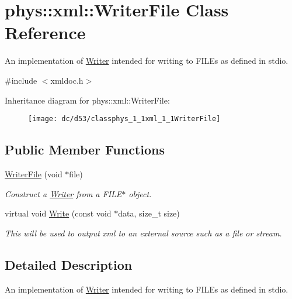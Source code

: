 \hypertarget{classphys_1_1xml_1_1WriterFile}{
\section{phys::xml::WriterFile Class Reference}
\label{dc/d53/classphys_1_1xml_1_1WriterFile}
}


An implementation of \hyperlink{classphys_1_1xml_1_1Writer}{Writer} intended for writing to FILEs as defined in stdio.  




{\ttfamily \#include $<$xmldoc.h$>$}

Inheritance diagram for phys::xml::WriterFile:\begin{figure}[H]
\begin{center}
\leavevmode
\texttt{[image: dc/d53/classphys\_1\_1xml\_1\_1WriterFile]}
\end{center}
\end{figure}
\subsection*{Public Member Functions}
\begin{DoxyCompactItemize}
\item 
\hyperlink{classphys_1_1xml_1_1WriterFile_aba665d4dc17c956798a80cb4e8c2774d}{WriterFile} (void $\ast$file)
\begin{DoxyCompactList}\small\item\em Construct a \hyperlink{classphys_1_1xml_1_1Writer}{Writer} from a FILE$\ast$ object. \item\end{DoxyCompactList}\item 
virtual void \hyperlink{classphys_1_1xml_1_1WriterFile_a4c4348e30dc03b22f7d4ee15bd386ab2}{Write} (const void $\ast$data, size\_\-t size)
\begin{DoxyCompactList}\small\item\em This will be used to output xml to an external source such as a file or stream. \item\end{DoxyCompactList}\end{DoxyCompactItemize}


\subsection{Detailed Description}
An implementation of \hyperlink{classphys_1_1xml_1_1Writer}{Writer} intended for writing to FILEs as defined in stdio. 

